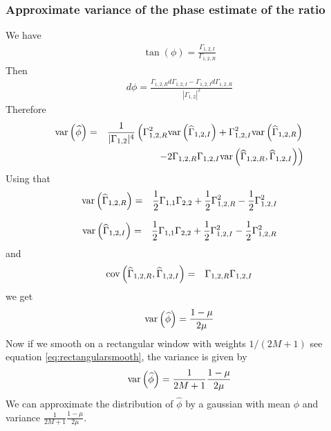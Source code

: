 \subsubsection{Approximate variance of the phase estimate of the ratio}
We have
\begin{eqnarray*}
 \tan(\phi) = \frac{\Gamma_{1,2,I} }{\Gamma_{1,2,R}}
\end{eqnarray*}
Then
\begin{eqnarray*}
 d\phi =
 \frac{\Gamma_{1,2,R}d\Gamma_{1,2,I}-\Gamma_{1,2,I}d\Gamma_{1,2,R}}
      {|\Gamma_{1,2}|^{2}}
\end{eqnarray*}
Therefore
\begin{eqnarray*}
 \mathrm{var}\left( \widehat \phi \right)&=&\frac{1}{|\Gamma_{1,2}|^{4}}
 \left(
 \Gamma_{1,2,R}^{2}\mathrm{var}\left( \widehat \Gamma_{1,2,I} \right)
 +
 \Gamma_{1,2,I}^{2}\mathrm{var}\left( \widehat \Gamma_{1,2,R} \right) \right .
 \\
 && \left .
 -2\Gamma_{1,2,R}\Gamma_{1,2,I}\mathrm{var}\left( \widehat \Gamma_{1,2,R},\widehat \Gamma_{1,2,I} \right)
 \right)
\end{eqnarray*}
Using that 
\begin{eqnarray*}
 \mathrm{var}\left( \widehat \Gamma_{1,2,R} \right)
 &=&
 \frac{1}{2}\Gamma_{1,1}\Gamma_{2,2}+\frac{1}{2}\Gamma_{1,2,R}^{2}-\frac{1}{2}\Gamma_{1,2,I}^{2}
\end{eqnarray*}

\begin{eqnarray*}
 \mathrm{var}\left( \widehat \Gamma_{1,2,I} \right)
 &=&
 \frac{1}{2}\Gamma_{1,1}\Gamma_{2,2}+\frac{1}{2}
 \Gamma_{1,2,I}^{2}-\frac{1}{2}\Gamma_{1,2,R}^{2}
\end{eqnarray*}
and
\begin{eqnarray*}
 \mathrm{cov}\left( \widehat \Gamma_{1,2,R},\widehat \Gamma_{1,2,I} \right)
 &=&
\Gamma_{1,2,R}\Gamma_{1,2,I}
\end{eqnarray*}
we get
\begin{eqnarray*}
 \mathrm{var}\left( \widehat \phi \right)=\frac{1-\mu}{2\mu}
\end{eqnarray*}
Now if we smooth on a rectangular window with weights $1/(2M+1)$ see equation \eqref{eq:rectangularsmooth}, the variance
is given by
\begin{eqnarray*}
 \mathrm{var}\left( \widehat \phi \right)=\frac{1}{2M+1}\frac{1-\mu}{2\mu}
\end{eqnarray*}
We can approximate the distribution of $\hat \phi$ by a gaussian with mean $\phi$ and variance 
$\frac{1}{2M+1}\frac{1-\mu}{2\mu}$. 
